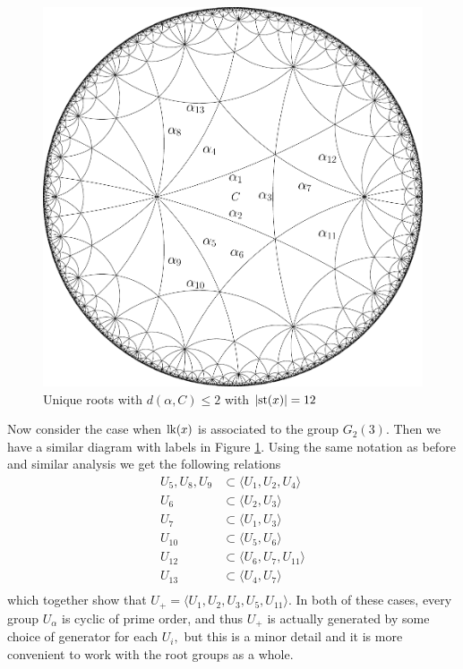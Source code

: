 \documentclass[class=book, crop=false]{standalone}
\begin{document}
	\begin{figure}[h]
	\begin{center}
		\includegraphics[width=6.5 in]{diagrams/roots336.pdf}
	\end{center}	
	\caption{Unique roots with $d(\alpha,C)\le 2$ with $|\mathrm{st}(x)|=12$}
	\label{fig:root336}
	\end{figure}
Now consider the case when $\mathrm{lk}(x)$ is associated to the group $G_2(3).$ Then we have a similar diagram with labels in Figure \ref{fig:root336}.  Using the same notation as before and similar analysis we get the following relations
\begin{align*}
	U_5,U_8,U_9&\subset \langle U_1,U_2,U_4\rangle\\
	U_6&\subset \langle U_2,U_3\rangle\\
	U_7&\subset \langle U_1,U_3\rangle\\
	U_{10}&\subset \langle U_5,U_6\rangle\\
	U_{12}&\subset \langle U_6,U_7,U_{11}\rangle\\
	U_{13}&\subset \langle U_4,U_7\rangle\\
\end{align*}
which together show that $U_+=\langle U_1,U_2,U_3,U_5,U_{11}\rangle.$ In both of these cases, every group $U_\alpha$ is cyclic of prime order, and thus $U_+$ is actually generated by some choice of generator for each $U_i,$ but this is a minor detail and it is more convenient to work with the root groups as a whole. 
\end{document}

